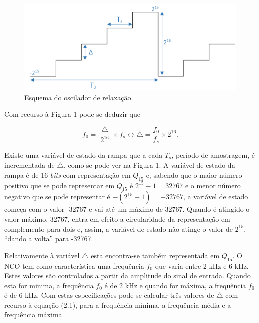 \documentclass[11pt]{article}
\numberwithin{equation}{section}
\begin{document}
\begin{figure}[H]
	\centering
	\includegraphics[keepaspectratio=true, scale=0.37]{teoricas/rampa}
	\caption{Esquema do oscilador de relaxação.}
	\vspace{-0.8em}
\end{figure}

\pagebreak

Com recurso à Figura 1 pode-se deduzir que

\vspace{-3mm}
\begin{equation}
f_{0} = \frac{\bigtriangleup}{2^{16}} \times f_{s} \leftrightarrow \bigtriangleup = \frac{f_{0}}{f_{s}} \times 2^{16}.
\end{equation}

Existe uma variável de estado da rampa que a cada $T_{s}$, período de amostragem, é incrementada de $\bigtriangleup$, como se pode ver na Figura 1. A variável de estado da rampa é de 16 \textit{bits} com representação em $Q_{15}$ e, sabendo que o maior número positivo que se pode representar em $Q_{15}$ é $2^{15} - 1 = 32767$ e o menor número negativo que se pode representar é  $-(2^{15} - 1) = -32767$, a variável de estado começa com o valor -32767 e vai até um máximo de 32767. Quando é atingido o valor máximo, 32767, entra em efeito a circularidade da representação em complemento para dois e, assim, a variável de estado não atinge o valor de $2^{15}$, ``dando a volta'' para -32767. 

Relativamente à variável $\bigtriangleup$ esta encontra-se também representada em $Q_{15}$. O NCO tem como característica uma frequência $f_{0}$ que varia entre 2 kHz e 6 kHz. Estes valores são controlados a partir da amplitude do sinal de entrada. Quando esta for minima, a frequência $f_{0}$ é de 2 kHz e quando for máxima, a frequência $f_{0}$ é de 6 kHz. Com estas especificações pode-se calcular três valores de $\bigtriangleup$ com recurso à equação (2.1), para a frequência mínima, a frequência média e a frequência máxima.
\end{document}
